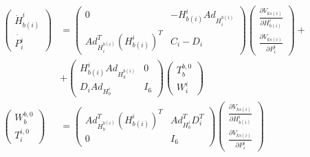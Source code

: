 \documentclass[a4paper,twoside, openright,12pt]{report}
\begin{document}
\begin{eqnarray}\label{EQ:internalimpedance}
\begin{aligned}
\begin{pmatrix}\dot{H}_{b(i)}^i \\ 
\dot{P_i^i} \end{pmatrix} &= \begin{pmatrix}
0 & -H_{b(i)}^i Ad_{H_i^{b(i)}} \\
Ad_{H_i^{b(i)}}^T (H_{b(i)}^i)^T & C_i - D_i
\end{pmatrix}
\begin{pmatrix}
\frac{\partial V_{ks(i)}}{\partial H_{b(i)}^i} \\ 
\frac{\partial V_{ks(i)}}{\partial P_{i}^i}
\end{pmatrix} + \\ &+
\begin{pmatrix}
H_{b(i)}^i Ad_{H_b^{b(i)}} & 0 \\
D_i Ad_{H_b^i} & I_6
\end{pmatrix}
\begin{pmatrix}
T_b^{b,0} \\ W_i^i
\end{pmatrix}
 \\
\begin{pmatrix}
W_b^{b,0} \\ T_i^{i,0}
\end{pmatrix} &= 
\begin{pmatrix}
Ad_{H_b^{b(i)}}^T (H_{b(i)}^i)^T &  Ad_{H_b^i}^T D_i^T \\
 0 & I_6
\end{pmatrix}
\begin{pmatrix}
\frac{\partial V_{ks(i)}}{\partial H_{b(i)}^i} \\ 
\frac{\partial V_{ks(i)}}{\partial P_{i}^i}
\end{pmatrix}
\end{aligned}
\end{eqnarray}
\end{document}
